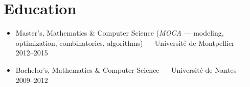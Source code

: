 \section*{Education}

\begin{itemize}
  \item Master's, Mathematics \& Computer Science (\textit{MOCA} --- modeling, optimization, combinatorics, algorithms) --- Universit\'e de Montpellier --- 2012--2015
  \item Bachelor's, Mathematics \& Computer Science --- Universit\'e de Nantes --- 2009--2012
\end{itemize}
